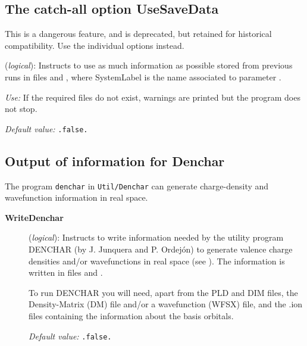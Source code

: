 \vspace{5pt}
\subsection{The catch-all option UseSaveData}

This is a dangerous feature, and is deprecated, but retained for
historical compatibility. Use the individual options instead.

\begin{description}
\itemsep 10pt
\parsep 0pt


\item[\textbf{UseSaveData}] (\textit{logical}):   Instructs to use as
  much information as possible stored from previous runs in files 
   and ,
  where SystemLabel is the name associated to parameter .

\textit{Use:} If the required files do not exist, warnings are
printed but the program does not stop.

\textit{Default value:} \texttt{.false.}

\end{description}

\vspace{5pt}
\subsection{Output of information for Denchar}

The program \texttt{denchar} in \texttt{Util/Denchar} can generate
charge-density and wavefunction information in real space.

\begin{description}

  \item[\textbf{WriteDenchar}] (\textit{logical}):
    Instructs to write information
  needed by the utility program DENCHAR (by J. Junquera and
  P. Ordej\'on) to generate valence charge densities and/or
  wavefunctions in real space (see ). The
  information is written in files  and .

To run DENCHAR you will need, apart from the PLD and DIM files,
the Density-Matrix (DM) file and/or a wavefunction (WFSX)
file, and the .ion files containing the information about the basis
orbitals.

\textit{Default value:} \texttt{.false.}

\end{description}



